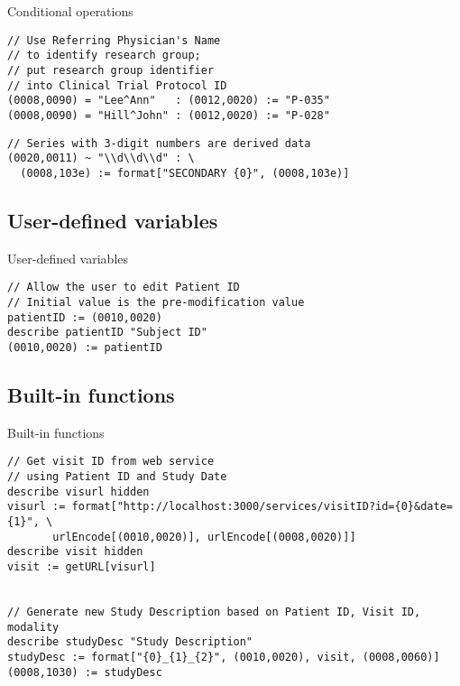 \documentclass[handout]{beamer}
\begin{document}
\begin{frame}[fragile]{Conditional operations}

\begin{verbatim}
// Use Referring Physician's Name
// to identify research group;
// put research group identifier
// into Clinical Trial Protocol ID
(0008,0090) = "Lee^Ann"   : (0012,0020) := "P-035"
(0008,0090) = "Hill^John" : (0012,0020) := "P-028"
\end{verbatim}

\pause
\begin{verbatim}
// Series with 3-digit numbers are derived data
(0020,0011) ~ "\\d\\d\\d" : \
  (0008,103e) := format["SECONDARY {0}", (0008,103e)]
\end{verbatim}

\end{frame}

\subsection{User-defined variables}
\begin{frame}[fragile]{User-defined variables}

\begin{verbatim}
// Allow the user to edit Patient ID
// Initial value is the pre-modification value
patientID := (0010,0020)
describe patientID "Subject ID"
(0010,0020) := patientID
\end{verbatim}

\end{frame}

\subsection{Built-in functions}
\begin{frame}[fragile]{Built-in functions}
\scriptsize
\begin{verbatim}
// Get visit ID from web service
// using Patient ID and Study Date
describe visurl hidden
visurl := format["http://localhost:3000/services/visitID?id={0}&date={1}", \
       urlEncode[(0010,0020)], urlEncode[(0008,0020)]]
describe visit hidden
visit := getURL[visurl]


// Generate new Study Description based on Patient ID, Visit ID, modality
describe studyDesc "Study Description"
studyDesc := format["{0}_{1}_{2}", (0010,0020), visit, (0008,0060)]
(0008,1030) := studyDesc
\end{verbatim}
\end{frame}
\end{document}
